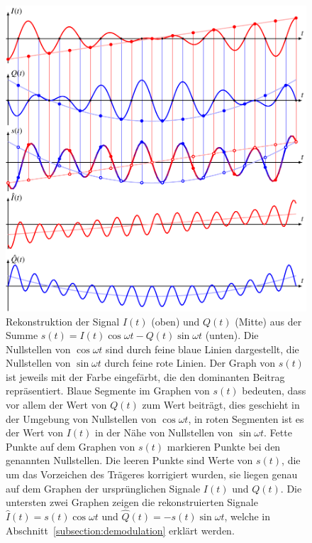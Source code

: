 \begin{figure}
\centering
\includegraphics{applications/qam/sep.pdf}
\caption{Rekonstruktion der Signal $I(t)$ (oben) und $Q(t)$ (Mitte)
aus der Summe $s(t) = I(t)\cos\omega t - Q(t)\sin\omega t$ (unten).
Die Nullstellen von $\cos\omega t$ sind durch feine blaue Linien 
dargestellt, die Nullstellen von $\sin\omega t$ durch feine rote Linien.
Der Graph von $s(t)$ ist jeweils mit der Farbe eingefärbt, die den
dominanten Beitrag repräsentiert.
Blaue Segmente im Graphen von $s(t)$ bedeuten, dass vor allem der Wert
von $Q(t)$ zum Wert beiträgt, dies geschieht in der Umgebung von
Nullstellen von $\cos\omega t$, in roten Segmenten ist es der Wert von
$I(t)$ in der Nähe von Nullstellen von $\sin\omega t$.
Fette Punkte auf dem Graphen von $s(t)$ markieren Punkte bei den
genannten Nullstellen.
Die leeren Punkte sind Werte von $s(t)$, die um das Vorzeichen des
Trägeres korrigiert wurden, sie liegen genau auf dem Graphen der
ursprünglichen Signale $I(t)$ und $Q(t)$.
Die untersten zwei Graphen zeigen die rekonstruierten Signale
$\hat{I}(t)=s(t) \cos\omega t$ und $\hat{Q}(t) = -s(t) \sin\omega t$, 
welche in Abschnitt~\ref{subsection:demodulation} erklärt werden.
\label{figure:qam:sep}}
\end{figure}

